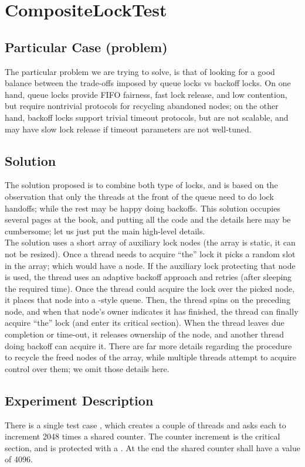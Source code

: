 \section{\textbf{CompositeLockTest}}

\subsection{Particular Case (problem)}
The particular problem we are trying to solve, is that of looking for
a good balance between the trade-offs imposed by queue locks vs backoff
locks. On one hand, queue locks provide FIFO fairness, fast lock
release, and low contention, but require nontrivial
protocols for recycling abandoned nodes; on the other hand, backoff
locks support trivial timeout protocols, but are not scalable, and may
have slow lock release if timeout parameters are not well-tuned.

\subsection{Solution}
The solution proposed is to combine both type of locks, and is based
on the observation that only the threads at the front of the queue
need to do lock handoffs; while the rest may be happy doing
backoffs. This solution occupies several pages at the book, and
putting all the code and the details here may be cumbersome; let us
just put the main high-level details. \\

The  solution uses a short array of auxiliary lock
nodes (the array is static, it can not be resized). Once a thread
needs to acquire ``the'' lock it picks a random slot in the array;
which would have a node. If the auxiliary lock protecting that node is
used, the thread uses an adaptive backoff approach and retries (after
sleeping the required time). Once 
the thread could acquire the lock over the picked node, it places
that node into a -style queue. Then, the thread spins on
the preceding node, and when that node's owner indicates it has
finished, the thread can finally acquire ``the'' lock (and enter its
critical section). When the thread leaves due completion or time-out,
it releases ownership of the node, and another thread doing backoff 
can acquire it. There are far more details regarding the procedure to
recycle the freed nodes of the array, while multiple threads attempt
to acquire control over them; we omit those details here.

\subsection{Experiment Description}
There is a single test case , which creates a couple
of threads and asks each to increment 2048 times a shared counter. The
counter increment is the critical section, and is protected with a
. At the end the shared counter shall have a value of
4096. 

